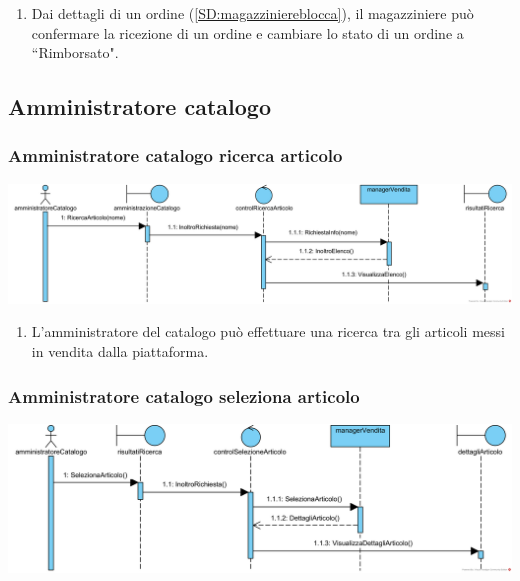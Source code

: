 \documentclass[12pt,a4paper]{article}
\begin{document}
\begin{enumerate}
\item Dai dettagli di un ordine (\ref{SD:magazziniereblocca}), il magazziniere può confermare la ricezione di un ordine e cambiare lo stato di un ordine a ``Rimborsato".
\end{enumerate}

\newpage

\subsection{Amministratore catalogo}
\subsubsection{Amministratore catalogo ricerca articolo}
\label{SD:amcatvisualizzaelenco}
\begin{center}
\includegraphics[width=\textwidth]{SequenceDiagram/AmministratoreCatalogoVenditaRicerca}
\end{center}

\begin{enumerate}
\item L'amministratore del catalogo può effettuare una ricerca tra gli articoli messi in vendita dalla piattaforma.
\end{enumerate}

\subsubsection{Amministratore catalogo seleziona articolo}
\label{SD:amcatselezionaarticolo}
\begin{center}
\includegraphics[width=\textwidth]{SequenceDiagram/AmministratoreCatalogoVenditaSeleziona}
\end{center}
\end{document}
